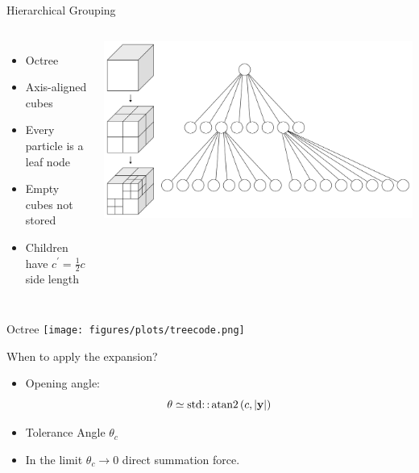 \begin{frame}{Hierarchical Grouping}
	\begin{columns}
		\begin{itemize}
			\item Octree
			\item Axis-aligned cubes
			\item Every particle is a leaf node
			\item Empty cubes not stored
			\item Children have $c^\prime = \frac{1}{2}c$ side length
		\end{itemize}
		\includegraphics[width=\linewidth]{figures/cube.png}
	\end{columns}
\end{frame}

\begin{frame}[plain]{Octree}
	\texttt{[image: figures/plots/treecode.png]}
\end{frame}

\begin{frame}{When to apply the expansion?}
	\begin{itemize}
		\item Opening angle:
		      \begin{equation}
			      \theta \simeq \operatorname{std::atan2}\left({c, |\vb{y}| }\right)
		      \end{equation}
		\item Tolerance Angle $\theta_c$
		\item In the limit $\theta_c \rightarrow 0$  direct summation force.
	\end{itemize}
\end{frame}

